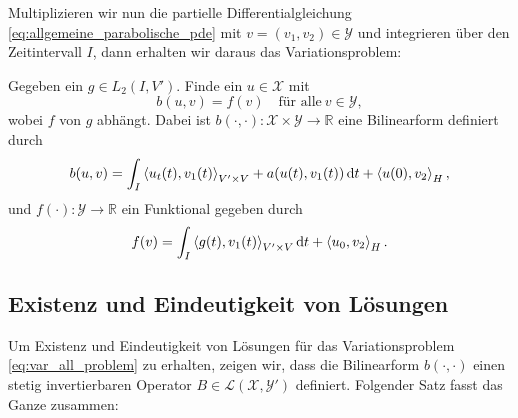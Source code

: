 Multiplizieren wir nun die partielle Differentialgleichung \eqref{eq:allgemeine_parabolische_pde} mit $v = (v_{1}, v_{2}) \in \mathcal Y$ und integrieren über den Zeitintervall $I$,  dann erhalten wir daraus das Variationsproblem:

Gegeben ein $g \in L_{2}(I, V')$. Finde ein $u \in \mathcal X$ mit
\begin{equation}
    \label{eq:var_all_problem}
    b(u, v) = f(v) \quad \text{für alle}~v \in \mathcal Y,
\end{equation}
wobei $f$ von $g$ abhängt.
Dabei ist $b(\cdot, \cdot) \colon \mathcal X \times \mathcal Y \to \mathbb{R}$ eine Bilinearform definiert durch
\begin{equation}
    \label{eq:var_all_bf_b}
    b(u, v) = \int_{I} \left\langle u_{t}(t),v_{1}(t)\right\rangle_{V' \times V} + a(u(t), v_{1}(t)) \mathop{}\!\mathrm{d} t + \left\langle u(0),v_{2}\right\rangle_{H},
\end{equation}
und $f(\cdot) \colon \mathcal Y \to \mathbb{R}$ ein Funktional gegeben durch
\begin{equation}
    \label{eq:var_all_f}
    f(v) = \int_{I} \left\langle g(t),v_{1}(t)\right\rangle_{V' \times V} \mathop{}\!\mathrm{d} t + \left\langle u_{0},v_{2}\right\rangle_{H}.
\end{equation}


\subsection{Existenz und Eindeutigkeit von Lösungen} %
\label{sub:existenz_und_eindeutigkeit_von_l_sungen}

Um Existenz und Eindeutigkeit von Lösungen für das Variationsproblem \eqref{eq:var_all_problem} zu erhalten, zeigen wir, dass die Bilinearform $b(\cdot, \cdot)$ einen stetig invertierbaren Operator $B \in \mathcal L(\mathcal X, \mathcal Y')$ definiert.
Folgender Satz fasst das Ganze zusammen:

